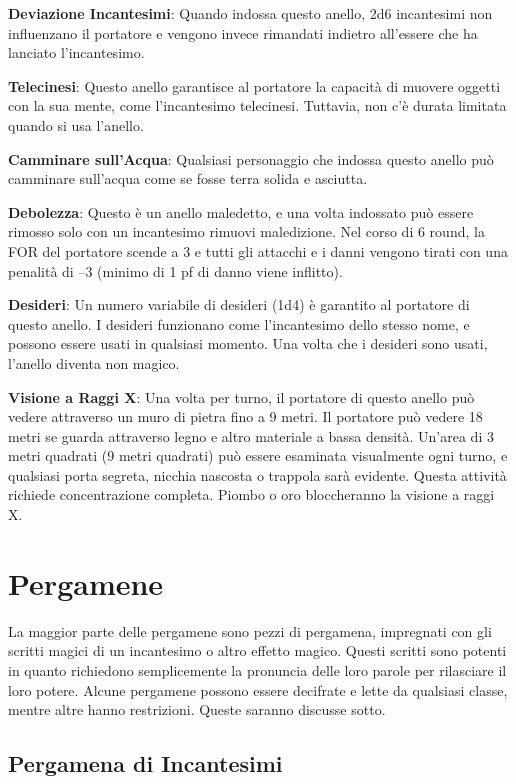 \documentclass{article}
\begin{document}
\begin{multicols}{2}
\textbf{Deviazione Incantesimi}: Quando indossa questo anello, 2d6 incantesimi non influenzano il portatore e vengono invece rimandati indietro all'essere che ha lanciato l'incantesimo.

\textbf{Telecinesi}: Questo anello garantisce al portatore la capacità di muovere oggetti con la sua mente, come l'incantesimo telecinesi. Tuttavia, non c'è durata limitata quando si usa l'anello.

\textbf{Camminare sull'Acqua}: Qualsiasi personaggio che indossa questo anello può camminare sull'acqua come se fosse terra solida e asciutta.

\textbf{Debolezza}: Questo è un anello maledetto, e una volta indossato può essere rimosso solo con un incantesimo rimuovi maledizione. Nel corso di 6 round, la FOR del portatore scende a 3 e tutti gli attacchi e i danni vengono tirati con una penalità di –3 (minimo di 1 pf di danno viene inflitto).

\textbf{Desideri}: Un numero variabile di desideri (1d4) è garantito al portatore di questo anello. I desideri funzionano come l'incantesimo dello stesso nome, e possono essere usati in qualsiasi momento. Una volta che i desideri sono usati, l'anello diventa non magico.

\textbf{Visione a Raggi X}: Una volta per turno, il portatore di questo anello può vedere attraverso un muro di pietra fino a 9 metri. Il portatore può vedere 18 metri se guarda attraverso legno e altro materiale a bassa densità. Un'area di 3 metri quadrati (9 metri quadrati) può essere esaminata visualmente ogni turno, e qualsiasi porta segreta, nicchia nascosta o trappola sarà evidente. Questa attività richiede concentrazione completa. Piombo o oro bloccheranno la visione a raggi X.

\section{Pergamene}

La maggior parte delle pergamene sono pezzi di pergamena, impregnati con gli scritti magici di un incantesimo o altro effetto magico. Questi scritti sono potenti in quanto richiedono semplicemente la pronuncia delle loro parole per rilasciare il loro potere. Alcune pergamene possono essere decifrate e lette da qualsiasi classe, mentre altre hanno restrizioni. Queste saranno discusse sotto.

\subsection{Pergamena di Incantesimi}


\end{multicols}
\end{document}
